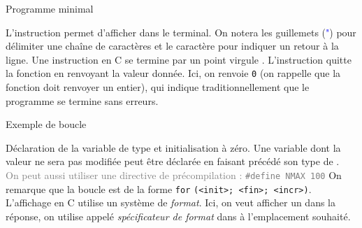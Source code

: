 \documentclass[10pt]{beamer}
\begin{document}
\begin{frame}[fragile]{\Ctitle}{\stitle}
\begin{exampleblock}{Programme minimal}
\begin{overprint}
			\medskip
			L'instruction  permet d'afficher dans le terminal. On notera les guillemets (\textcolor{blue}{"}) pour délimiter une chaîne de caractères et le caractère  pour indiquer un retour à la ligne. Une instruction en C se termine par un point virgule \kw{;}.
			\onslide<6>
			\medskip
			L'instruction  quitte la fonction en renvoyant la valeur donnée. Ici, on renvoie {\tt 0} (on rappelle que la fonction doit renvoyer un entier), qui indique traditionnellement que le programme se  termine sans erreurs.
		\end{overprint}
	\end{exampleblock}

\end{frame}

\begin{frame}{\Ctitle}{\stitle}
	\begin{exampleblock}{Exemple de boucle}
		\begin{overprint}
		\medskip
		Déclaration de la variable  de type  et initialisation à zéro.
		\onslide<2>
		\medskip
		Une variable dont la valeur ne sera pas modifiée peut être déclarée  en faisant précédé son type de .\\
		\textcolor{gray}{On peut aussi utiliser une directive de précompilation : {\tt \#define NMAX 100}}
		\onslide<3>
		\medskip
		On remarque que la boucle  est de la forme {\tt for} {\tt(<init>; <fin>; <incr>)}.
		\onslide<4>
		L'affichage en C utilise un système de \textit{format}. Ici, on veut afficher un  dans la réponse, on utilise  appelé \textit{spécificateur de format} dans  à l'emplacement souhaité.
		\medskip
		\end{overprint}
	\end{exampleblock}
\end{frame}
\end{document}
